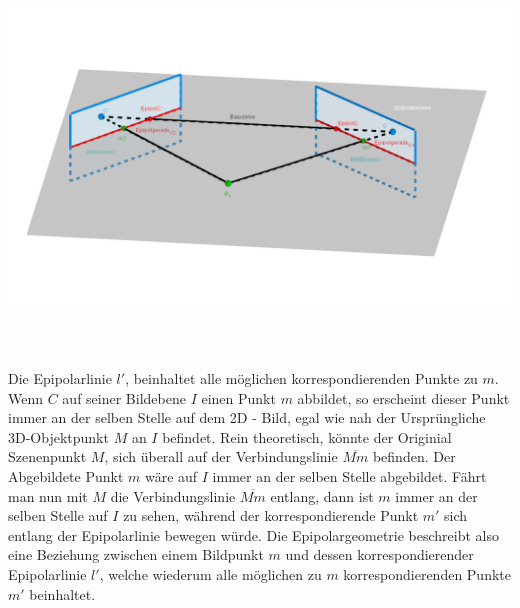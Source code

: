 \begin{minipage}{\linewidth}
	\centering
	\includegraphics[width=1.\linewidth]{images/EpipolarGeoemtrieGrafik.png}
	\label{fig:Epipolargeometry}
\end{minipage}\\ \\


Die Epipolarlinie $l'$, beinhaltet alle möglichen korrespondierenden Punkte zu $m$. Wenn $C$ auf seiner Bildebene $I$ einen Punkt $m$ abbildet, so erscheint dieser Punkt immer an der selben Stelle auf dem 2D - Bild, egal wie nah der Ursprüngliche 3D-Objektpunkt $M$ an $I$ befindet. Rein theoretisch, könnte der Originial Szenenpunkt $M$, sich überall auf der Verbindungslinie $\overline{Mm}$ befinden. Der Abgebildete Punkt $m$ wäre auf $I$ immer an der selben Stelle abgebildet. Fährt man nun mit $M$ die Verbindungslinie $\overline{Mm}$ entlang, dann ist $m$ immer an der selben Stelle auf $I$ zu sehen, während der korrespondierende Punkt $m'$ sich entlang der Epipolarlinie bewegen würde. Die Epipolargeometrie beschreibt also eine Beziehung zwischen einem Bildpunkt $m$ und dessen korrespondierender Epipolarlinie $l'$, welche wiederum alle möglichen zu $m$ korrespondierenden Punkte $m'$ beinhaltet\cite{HZ,Zhang2014,ZZGXr}.\\



